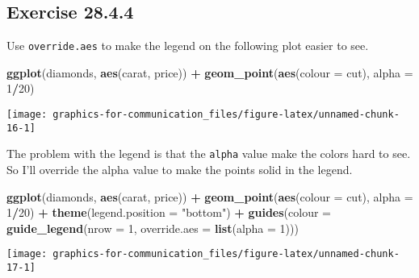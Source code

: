 \documentclass[]{book}
\newenvironment{Shaded}{\begin{snugshade}}{\end{snugshade}}
\newcommand{\DataTypeTok}[1]{\textcolor[rgb]{0.13,0.29,0.53}{#1}}
\newcommand{\DecValTok}[1]{\textcolor[rgb]{0.00,0.00,0.81}{#1}}
\newcommand{\KeywordTok}[1]{\textcolor[rgb]{0.13,0.29,0.53}{\textbf{#1}}}
\newcommand{\NormalTok}[1]{#1}
\newcommand{\OperatorTok}[1]{\textcolor[rgb]{0.81,0.36,0.00}{\textbf{#1}}}
\newcommand{\StringTok}[1]{\textcolor[rgb]{0.31,0.60,0.02}{#1}}
\theoremstyle{plain}
\theoremstyle{remark}
\begin{document}
\hypertarget{exercise-28.4.4}{%
\subsection*{\texorpdfstring{Exercise
{28.4.4}}{Exercise 28.4.4}}\label{exercise-28.4.4}}

Use \texttt{override.aes} to make the legend on the following plot
easier to see.

\begin{Shaded}
\begin{Highlighting}[]
\KeywordTok{ggplot}\NormalTok{(diamonds, }\KeywordTok{aes}\NormalTok{(carat, price)) }\OperatorTok{+}
\StringTok{  }\KeywordTok{geom_point}\NormalTok{(}\KeywordTok{aes}\NormalTok{(}\DataTypeTok{colour =}\NormalTok{ cut), }\DataTypeTok{alpha =} \DecValTok{1}\OperatorTok{/}\DecValTok{20}\NormalTok{)}
\end{Highlighting}
\end{Shaded}

\begin{center}\texttt{[image: graphics-for-communication\_files/figure-latex/unnamed-chunk-16-1]} \end{center}

The problem with the legend is that the \texttt{alpha} value make the
colors hard to see. So I'll override the alpha value to make the points
solid in the legend.

\begin{Shaded}
\begin{Highlighting}[]
\KeywordTok{ggplot}\NormalTok{(diamonds, }\KeywordTok{aes}\NormalTok{(carat, price)) }\OperatorTok{+}
\StringTok{  }\KeywordTok{geom_point}\NormalTok{(}\KeywordTok{aes}\NormalTok{(}\DataTypeTok{colour =}\NormalTok{ cut), }\DataTypeTok{alpha =} \DecValTok{1}\OperatorTok{/}\DecValTok{20}\NormalTok{)  }\OperatorTok{+}
\StringTok{  }\KeywordTok{theme}\NormalTok{(}\DataTypeTok{legend.position =} \StringTok{"bottom"}\NormalTok{) }\OperatorTok{+}
\StringTok{  }\KeywordTok{guides}\NormalTok{(}\DataTypeTok{colour =} \KeywordTok{guide_legend}\NormalTok{(}\DataTypeTok{nrow =} \DecValTok{1}\NormalTok{, }\DataTypeTok{override.aes =} \KeywordTok{list}\NormalTok{(}\DataTypeTok{alpha =} \DecValTok{1}\NormalTok{)))  }
\end{Highlighting}
\end{Shaded}

\begin{center}\texttt{[image: graphics-for-communication\_files/figure-latex/unnamed-chunk-17-1]} \end{center}
\end{document}
